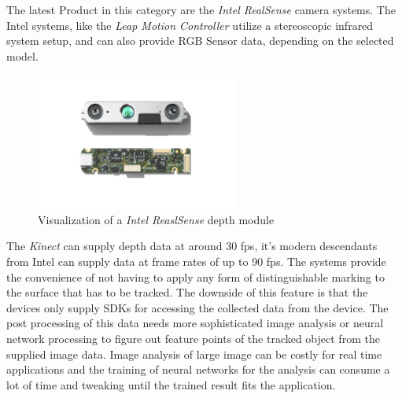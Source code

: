 The latest Product in this category are the \textit{Intel RealSense} camera systems\cite{IntelCorporation.2018}. The Intel systems, like the\textit{ Leap Motion Controller} utilize a stereoscopic infrared system setup, and can also provide RGB Sensor data, depending on the selected model.
\begin{figure}[H]
\centering
\includegraphics[width=0.6\textwidth]{images/RealSense.png}
\caption{Visualization of a \textit{Intel ReaslSense} depth module\cite{IntelCorporation.2018}}
\label{img:leapMotion} 
\end{figure}
The \textit{Kinect} can supply depth data at around 30 fps, it's modern  descendants from Intel can supply data at frame rates of up to 90 fps. The systems provide the convenience of not having to apply any form of distinguishable marking to the surface that has to be tracked. The downside of this feature is that the devices only supply SDKs for accessing the collected data from the device. The post processing of this data needs more sophisticated image analysis or neural network processing to figure out feature points of the tracked object from the supplied image data\cite{JamieShotton.2011,Oikonomidis.2011b}. Image analysis of large image can be costly for real time applications and the training of neural networks for the analysis can consume a lot of time and tweaking until the trained result fits the application.






